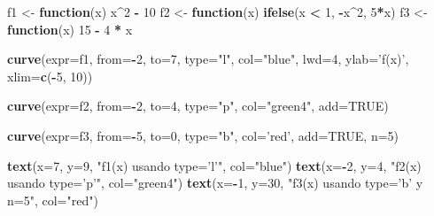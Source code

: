 \documentclass[10pt,]{krantz}
\makeatletter
\newenvironment{Shaded}{\begin{snugshade}}{\end{snugshade}}
\newcommand{\KeywordTok}[1]{\textcolor[rgb]{0.13,0.29,0.53}{\textbf{#1}}}
\newcommand{\DataTypeTok}[1]{\textcolor[rgb]{0.13,0.29,0.53}{#1}}
\newcommand{\DecValTok}[1]{\textcolor[rgb]{0.00,0.00,0.81}{#1}}
\newcommand{\StringTok}[1]{\textcolor[rgb]{0.31,0.60,0.02}{#1}}
\newcommand{\OtherTok}[1]{\textcolor[rgb]{0.56,0.35,0.01}{#1}}
\newcommand{\ControlFlowTok}[1]{\textcolor[rgb]{0.13,0.29,0.53}{\textbf{#1}}}
\newcommand{\OperatorTok}[1]{\textcolor[rgb]{0.81,0.36,0.00}{\textbf{#1}}}
\newcommand{\NormalTok}[1]{#1}
\newenvironment{kframe}{%
\medskip{}
\setlength{\fboxsep}{.8em}
 \def\at@end@of@kframe{}%
 \ifinner\ifhmode%
  \def\at@end@of@kframe{\end{minipage}}%
  \begin{minipage}{\columnwidth}%
 \fi\fi%
 \def\FrameCommand##1{\hskip\@totalleftmargin \hskip-\fboxsep
 \colorbox{shadecolor}{##1}\hskip-\fboxsep
     \hskip-\linewidth \hskip-\@totalleftmargin \hskip\columnwidth}%
 \MakeFramed {\advance\hsize-\width
   \@totalleftmargin\z@ \linewidth\hsize
   \@setminipage}}%
 {\par\unskip\endMakeFramed%
 \at@end@of@kframe}
\renewenvironment{Shaded}{\begin{kframe}}{\end{kframe}}
\makeatother
\begin{document}
\begin{Shaded}
\begin{Highlighting}[]
\NormalTok{f1 <-}\StringTok{ }\ControlFlowTok{function}\NormalTok{(x) x}\OperatorTok{^}\DecValTok{2} \OperatorTok{-}\StringTok{ }\DecValTok{10}
\NormalTok{f2 <-}\StringTok{ }\ControlFlowTok{function}\NormalTok{(x) }\KeywordTok{ifelse}\NormalTok{(x }\OperatorTok{<}\StringTok{ }\DecValTok{1}\NormalTok{, }\OperatorTok{-}\NormalTok{x}\OperatorTok{^}\DecValTok{2}\NormalTok{, }\DecValTok{5}\OperatorTok{*}\NormalTok{x)}
\NormalTok{f3 <-}\StringTok{ }\ControlFlowTok{function}\NormalTok{(x) }\DecValTok{15} \OperatorTok{-}\StringTok{ }\DecValTok{4} \OperatorTok{*}\StringTok{ }\NormalTok{x}

\KeywordTok{curve}\NormalTok{(}\DataTypeTok{expr=}\NormalTok{f1, }\DataTypeTok{from=}\OperatorTok{-}\DecValTok{2}\NormalTok{, }\DataTypeTok{to=}\DecValTok{7}\NormalTok{, }\DataTypeTok{type=}\StringTok{"l"}\NormalTok{,}
      \DataTypeTok{col=}\StringTok{"blue"}\NormalTok{, }\DataTypeTok{lwd=}\DecValTok{4}\NormalTok{, }\DataTypeTok{ylab=}\StringTok{'f(x)'}\NormalTok{, }\DataTypeTok{xlim=}\KeywordTok{c}\NormalTok{(}\OperatorTok{-}\DecValTok{5}\NormalTok{, }\DecValTok{10}\NormalTok{))}

\KeywordTok{curve}\NormalTok{(}\DataTypeTok{expr=}\NormalTok{f2, }\DataTypeTok{from=}\OperatorTok{-}\DecValTok{2}\NormalTok{, }\DataTypeTok{to=}\DecValTok{4}\NormalTok{, }\DataTypeTok{type=}\StringTok{"p"}\NormalTok{,}
      \DataTypeTok{col=}\StringTok{"green4"}\NormalTok{, }\DataTypeTok{add=}\OtherTok{TRUE}\NormalTok{)}

\KeywordTok{curve}\NormalTok{(}\DataTypeTok{expr=}\NormalTok{f3, }\DataTypeTok{from=}\OperatorTok{-}\DecValTok{5}\NormalTok{, }\DataTypeTok{to=}\DecValTok{0}\NormalTok{, }\DataTypeTok{type=}\StringTok{"b"}\NormalTok{,}
      \DataTypeTok{col=}\StringTok{'red'}\NormalTok{, }\DataTypeTok{add=}\OtherTok{TRUE}\NormalTok{, }\DataTypeTok{n=}\DecValTok{5}\NormalTok{)}

\KeywordTok{text}\NormalTok{(}\DataTypeTok{x=}\DecValTok{7}\NormalTok{, }\DataTypeTok{y=}\DecValTok{9}\NormalTok{, }\StringTok{"f1(x) usando type='l'"}\NormalTok{, }\DataTypeTok{col=}\StringTok{"blue"}\NormalTok{)}
\KeywordTok{text}\NormalTok{(}\DataTypeTok{x=}\OperatorTok{-}\DecValTok{2}\NormalTok{, }\DataTypeTok{y=}\DecValTok{4}\NormalTok{, }\StringTok{"f2(x) usando type='p'"}\NormalTok{, }\DataTypeTok{col=}\StringTok{"green4"}\NormalTok{)}
\KeywordTok{text}\NormalTok{(}\DataTypeTok{x=}\OperatorTok{-}\DecValTok{1}\NormalTok{, }\DataTypeTok{y=}\DecValTok{30}\NormalTok{, }\StringTok{"f3(x) usando type='b' y n=5"}\NormalTok{, }\DataTypeTok{col=}\StringTok{"red"}\NormalTok{)}
\end{Highlighting}
\end{Shaded}
\end{document}
